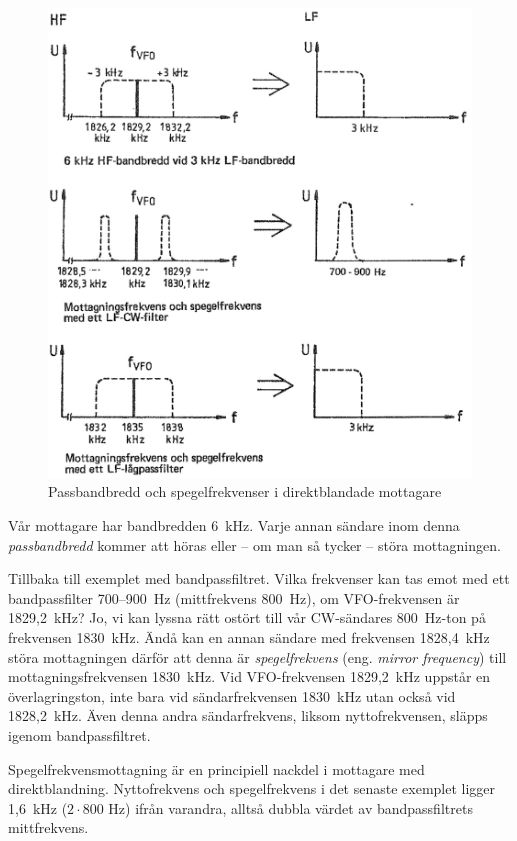 \begin{figure}
  \includegraphics[width=\textwidth]{images/cropped_pdfs/bild_2_4-12.pdf}
  \caption{Passbandbredd och spegelfrekvenser i direktblandade mottagare}
  \label{fig:bildII4-12}
\end{figure}

Vår mottagare har bandbredden 6~kHz.
Varje annan sändare inom denna \emph{passbandbredd} kommer att höras eller --
om man så tycker -- störa mottagningen.

Tillbaka till exemplet med bandpassfiltret.
Vilka frekvenser kan tas emot med ett bandpassfilter 700--900~Hz
(mittfrekvens 800~Hz), om VFO-frekvensen är 1829,2~kHz?
Jo, vi kan lyssna rätt ostört till vår CW-sändares 800~Hz-ton på frekvensen
1830~kHz.
Ändå kan en annan sändare med frekvensen 1828,4~kHz störa mottagningen därför
att denna är \emph{spegelfrekvens} (eng. \emph{mirror frequency}) till
mottagningsfrekvensen 1830~kHz.
Vid VFO-frekvensen 1829,2~kHz uppstår en överlagringston, inte bara vid
sändarfrekvensen 1830~kHz utan också vid 1828,2~kHz.
Även denna andra sändarfrekvens, liksom nyttofrekvensen, släpps igenom
bandpassfiltret.

Spegelfrekvensmottagning är en principiell nackdel i mottagare med
direktblandning.
Nyttofrekvens och spegelfrekvens i det senaste exemplet ligger 1,6~kHz
(\(2 \cdot 800\) Hz) ifrån varandra, alltså dubbla värdet av bandpassfiltrets
mittfrekvens.

